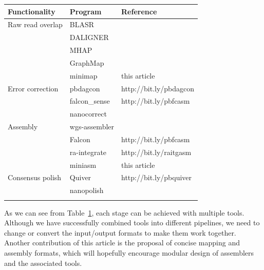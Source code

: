 \documentclass{bioinfo}
\begin{document}
\begin{table}[b]
{\footnotesize\label{tab:tools}
\begin{tabular}{p{2.4cm}p{2cm}l}
\toprule
Functionality & Program & Reference \\
\midrule
Raw read overlap & BLASR & \citet{Chaisson:2012aa}\\
& DALIGNER & \citet{DBLP:conf/wabi/Myers14} \\
& MHAP & \citet{Berlin:2015xy} \\
& GraphMap & \citet{sovic:2015aa} \\
& minimap & this article \\
Error correction & pbdagcon & http://bit.ly/pbdagcon \\
& falcon\_sense & http://bit.ly/pbfcasm \\
& nanocorrect & \citet{Loman:2015xu} \\
Assembly & wgs-assembler & \citet{Myers:2000kl} \\
& Falcon & http://bit.ly/pbfcasm \\
& ra-integrate & http://bit.ly/raitgasm \\
& miniasm & this article \\
Consensus polish & Quiver & http://bit.ly/pbquiver \\
& nanopolish & \citet{Loman:2015xu} \\
\botrule
\end{tabular}
}{}
\end{table}

As we can see from Table~\ref{tab:tools}, each stage can be achieved with multiple tools.
Although we have successfully combined tools into different pipelines, we
need to change or convert the input/output formats to make them work
together. Another contribution of this article is the proposal of concise
mapping and assembly formats, which will hopefully encourage modular design of
assemblers and the associated tools.
\end{document}
